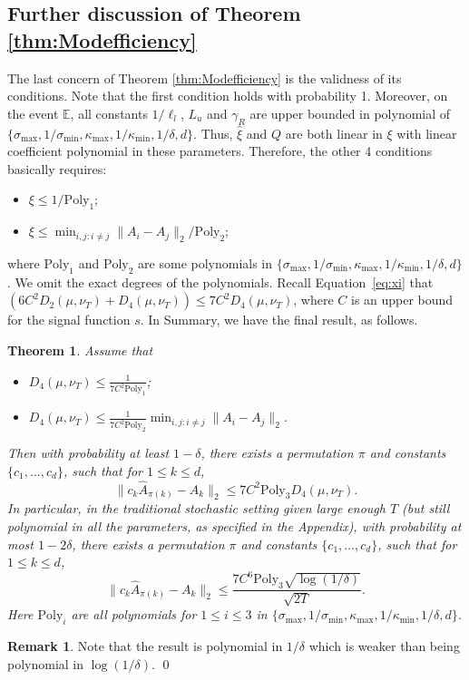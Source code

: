 \documentclass[twoside]{article}
\newcommand{\E}{\mathbb{E}}
\newtheorem{thm}[lemma]{Theorem}
\theoremstyle{definition}
\newtheorem{remark}[lemma]{Remark}
\begin{document}
\subsection{Further discussion of Theorem \ref{thm:Modefficiency}}
 \label{subsec:ThminStocSetting}
The last concern of Theorem \ref{thm:Modefficiency} is the validness of its conditions. 
Note that the first condition holds with probability 1. 
Moreover, on the event $\E$, all constants $1/\ell_l$, $L_u$ and $\gamma_R$ are upper bounded in polynomial of $\{\sigma_{\max}, 1/\sigma_{\min}, \kappa_{\max}, 1/\kappa_{\min},1/\delta, d\}$. 
Thus, $\widehat{\xi}$  and $Q$ are both linear in $\xi$ with linear coefficient polynomial in these parameters.
Therefore, the other 4 conditions basically requires:
\begin{itemize}
\item $\xi \le 1/ \text{Poly}_1$;
\item $\xi \le \min_{i,j:i\neq j} \|A_i - A_j\|_2 / \text{Poly}_2$;
\end{itemize} 
where $\text{Poly}_1$ and $\text{Poly}_2$ are some polynomials in $\{\sigma_{\max}, 1/\sigma_{\min}, \kappa_{\max}, 1/\kappa_{\min},1/\delta, d\}$. 
We omit the exact degrees of the polynomials.
Recall Equation~\eqref{eq:xi} that $\left( 6C^2D_2(\mu, \nu_T) + D_4(\mu, \nu_T)\right) \le 7C^2D_4(\mu, \nu_T)$, where $C$ is an upper bound for the signal function $s$.
In Summary, we have the final result, as follows.
\begin{thm}
\label{thm:finalRes}
 Assume that 
\begin{itemize}
\item $D_4(\mu, \nu_T) \le \frac{1}{7C^2\text{Poly}_1}$;
\item $D_4(\mu, \nu_T) \le \frac{1}{7C^2\text{Poly}_2}\min_{i,j:i\neq j} \|A_i - A_j\|_2$.
\end{itemize}
Then with probability at least $1-\delta$, there exists a permutation $\pi$ and constants $\{c_1,\ldots,c_d\}$, such that for $1\le k\le d$,
\[
\| c_k\widehat{A}_{\pi(k)} - A_k\|_2 \le 7C^2\text{Poly}_3D_4(\mu, \nu_T).
\]
In particular, in the traditional stochastic setting given large enough $T$ (but still polynomial in all the parameters, as specified in the Appendix), with probability at most $1-2\delta$, there exists a permutation $\pi$ and constants $\{c_1,\ldots,c_d\}$, such that for $1\le k\le d$,
\[
\| c_k\widehat{A}_{\pi(k)} - A_k\|_2 \le \frac{7C^6\text{Poly}_3\sqrt{\log(1/\delta)}}{\sqrt{2T}}.
\]
Here $\text{Poly}_i$ are all polynomials for $1\le i\le 3$ in $\{\sigma_{\max}, 1/\sigma_{\min}, \kappa_{\max}, 1/\kappa_{\min},1/\delta, d\}$.
\end{thm}
\begin{remark}
Note that the result is polynomial in $1/\delta$ which is weaker than being polynomial in $\log(1/\delta)$. \qed
\end{remark}
\end{document}
